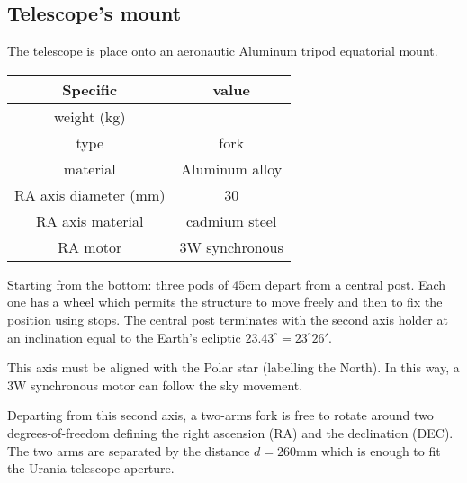 \subsection{Telescope's mount}
The telescope is place onto an aeronautic Aluminum tripod equatorial mount.
\\
\begin{minipage}{.4\textwidth}
    \begin{tabular}{cc}
        Specific & value \\
        \hline
        weight (kg) & \\
        type & fork \\
        material & Aluminum alloy \\
        RA axis diameter (mm) & 30 \\
        RA axis material & cadmium steel \\
        RA motor & 3W synchronous \\
        \hline
    \end{tabular}
    \label{tab:mount}
\end{minipage}

Starting from the bottom: three pods of 45cm depart from a central post. Each one has a wheel which permits the structure to move freely and then to fix the position using stops.
The central post terminates with the second axis holder at an inclination equal to the Earth's ecliptic \(23.43^{\circ} = 23^{\circ} 26'\).

This axis must be aligned with the Polar star (labelling the North).
In this way, a 3W synchronous motor can follow the sky movement.

Departing from this second axis, a two-arms fork is free to rotate around two degrees-of-freedom defining the right ascension (RA) and the declination (DEC).
The two arms are separated by the distance \(d = 260\)mm which is enough to fit the Urania telescope aperture.
